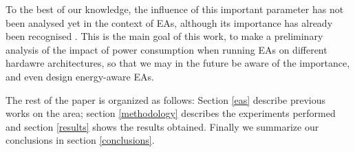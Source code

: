 To the best of our knowledge, the influence of this important
parameter has not been analysed yet in the context of EAs, although
its importance has already been recognised \cite{ephemeral}.  This is
the main goal of this work, to make a preliminary analysis of the
impact of power consumption when running EAs on different hardawre
architectures, so that we may in the future be aware of the
importance, and even design energy-aware EAs. 

The rest of the paper is organized as follows:  Section \ref{eas}
describe previous works on the area;  section \ref{methodology}
describes the experiments performed and section \ref{results} shows
the results obtained.  Finally we summarize our conclusions in section
\ref{conclusions}. 


